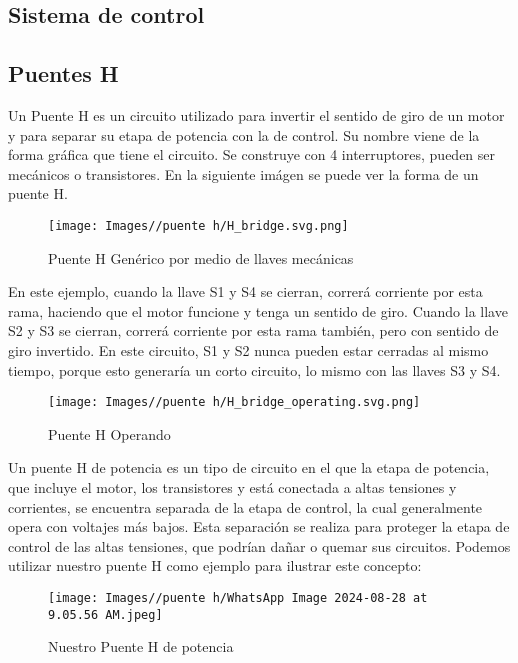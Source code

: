 \documentclass{article}
\begin{document}
\subsection{Sistema de control}

\subsection{Puentes H}
Un Puente H es un circuito utilizado para invertir el sentido de giro de un motor y para separar su etapa de potencia con la de control. Su nombre viene de la forma gráfica que tiene el circuito. Se construye con 4 interruptores, pueden ser mecánicos o transistores. En la siguiente imágen se puede ver la forma de un puente H.

\begin{figure}[H]
    \centering
    \texttt{[image: Images//puente h/H\_bridge.svg.png]}
    \caption{Puente H Genérico por medio de llaves mecánicas}
\end{figure}

En este ejemplo, cuando la llave S1 y S4 se cierran, correrá corriente por esta rama, haciendo que el motor funcione y tenga un sentido de giro. Cuando la llave S2 y S3 se cierran, correrá corriente por esta rama también, pero con sentido de giro invertido. En este circuito, S1 y S2 nunca pueden estar cerradas al mismo tiempo, porque esto generaría un corto circuito, lo mismo con las llaves S3 y S4.

\begin{figure}[H]
    \centering
    \texttt{[image: Images//puente h/H\_bridge\_operating.svg.png]}
    \caption{Puente H Operando}
\end{figure}

Un puente H de potencia es un tipo de circuito en el que la etapa de potencia, que incluye el motor, los transistores y está conectada a altas tensiones y corrientes, se encuentra separada de la etapa de control, la cual generalmente opera con voltajes más bajos. Esta separación se realiza para proteger la etapa de control de las altas tensiones, que podrían dañar o quemar sus circuitos. Podemos utilizar nuestro puente H como ejemplo para ilustrar este concepto:

 \begin{figure}[H]
     \centering
     \texttt{[image: Images//puente h/WhatsApp Image 2024-08-28 at 9.05.56 AM.jpeg]}
     \caption{Nuestro Puente H de potencia}
     \label{fig:enter-label}
 \end{figure}
\end{document}
